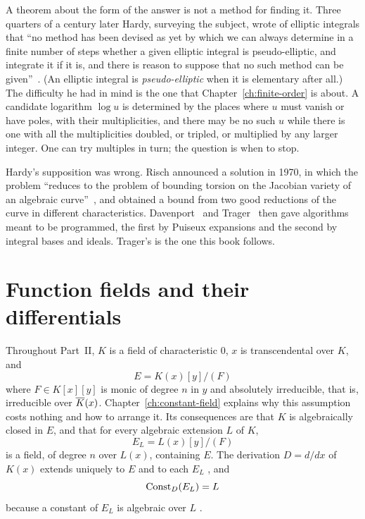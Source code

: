 A theorem about the form of the answer is not a method for finding it. Three
quarters of a century later Hardy, surveying the subject, wrote of elliptic
integrals that ``no method has been devised as yet by which we can always
determine in a finite number of steps whether a given elliptic integral is
pseudo-elliptic, and integrate it if it is, and there is reason to suppose that
no such method can be given''~\cite[pp.~47--48]{hardy1916}. (An elliptic
integral is \emph{pseudo-elliptic} when it is elementary after all.) The
difficulty he had in mind is the one that Chapter~\ref{ch:finite-order} is
about. A candidate logarithm $\log u$ is determined by the places where $u$
must vanish or have poles, with their multiplicities, and there may be no
such $u$ while there is one with all the multiplicities doubled, or tripled,
or multiplied by any larger integer. One can try multiples in turn; the
question is when to stop.

Hardy's supposition was wrong. Risch announced a solution in 1970, in which
the problem ``reduces to the problem of bounding torsion on the Jacobian
variety of an algebraic curve''~\cite{risch1970}, and obtained a bound from two good
reductions of the curve in different characteristics. Davenport~\cite{davenport1981} and
Trager~\cite{trager1984} then gave algorithms meant to be programmed, the
first by Puiseux expansions and the second by integral bases and ideals.
Trager's is the one this book follows.

\section{Function fields and their differentials}\label{sec:liouville-setting}

Throughout Part~II, $K$ is a field of characteristic $0$, $x$ is transcendental
over $K$, and
\[
  E = K(x)[y] / (F)
\]
where $F \in K[x][y]$ is monic of degree $n$ in $y$ and absolutely
irreducible, that is, irreducible over $\overline{K}(x)$. Chapter~\ref{ch:constant-field} explains why
this assumption costs nothing and how to arrange it. Its consequences are
that $K$ is algebraically closed in $E$, and that for every algebraic
extension $L$ of $K$,
\[
  E_L = L(x)[y] / (F)
\]
is a field, of degree $n$ over $L(x)$, containing $E$. The derivation $D =
d/dx$ of $K(x)$ extends uniquely to $E$ and to each $E_L$
, and
\[
  \operatorname{Const}_D(E_L) = L
\]
because a constant of $E_L$ is algebraic over $L$ .

